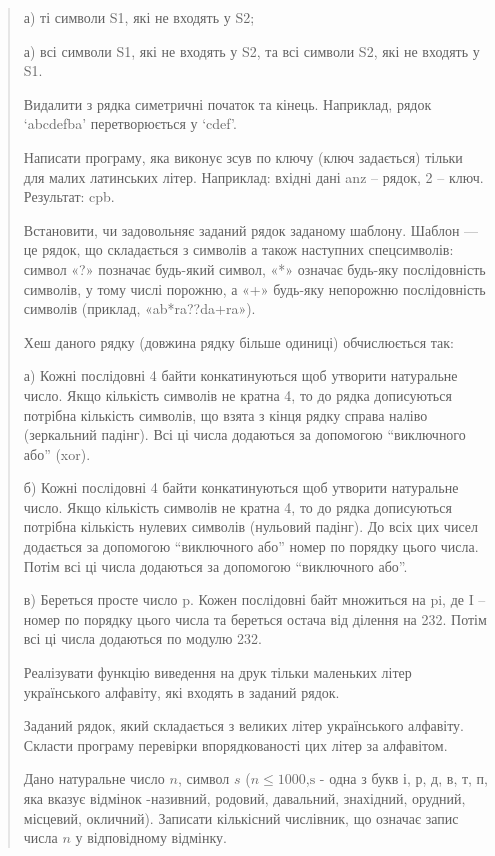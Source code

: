 \documentclass[]{article}
\begin{document}
\begin{quote}
а) ті символи S1, які не входять у S2;

а) всі символи S1, які не входять у S2, та всі символи S2, які не
входять у S1.

Видалити з рядка симетричні початок та кінець. Наприклад, рядок
`abcdefba' перетворюється у `cdef'.

Написати програму, яка виконує зсув по ключу (ключ задається) тільки для
малих латинських літер. Наприклад: вхідні дані anz -- рядок, 2 -- ключ.
Результат: cpb.

Встановити, чи задовольняє заданий рядок заданому шаблону. Шаблон --- це
рядок, що складається з символів а також наступних спецсимволів: символ
«?» позначає будь-який символ, «*» означає будь-яку послідовність
символів, у тому числі порожню, а «+» будь-яку непорожню послідовність
символів (приклад, «ab*ra??da+ra»).

Хеш даного рядку (довжина рядку більше одиниці) обчислюється так:

а) Кожні послідовні 4 байти конкатинуються щоб утворити натуральне
число. Якщо кількість символів не кратна 4, то до рядка дописуються
потрібна кількість символів, що взята з кінця рядку справа наліво
(зеркальний падінг). Всі ці числа додаються за допомогою ``виключного
або'' (xor).

б) Кожні послідовні 4 байти конкатинуються щоб утворити натуральне
число. Якщо кількість символів не кратна 4, то до рядка дописуються
потрібна кількість нулевих символів (нульовий падінг). До всіх цих чисел
додається за допомогою ``виключного або'' номер по порядку цього числа.
Потім всі ці числа додаються за допомогою ``виключного або''.

в) Береться просте число p. Кожен послідовні байт множиться на pi, де I
-- номер по порядку цього числа та береться остача від ділення на 232.
Потім всі ці числа додаються по модулю 232.

Реалізувати функцію виведення на друк тільки маленьких літер
українського алфавіту, які входять в заданий рядок.

Заданий рядок, який складається з великих літер українського алфавіту.
Скласти програму перевірки впорядкованості цих літер за алфавітом.

Дано натуральне число \(n\), символ \(s\)
(\(n \leq 1000\),\(\text{s\ }\)- одна з букв і, р, д, в, т, п, яка
вказує відмінок -називний, родовий, давальний, знахідний, орудний,
місцевий, окличний). Записати кількісний числівник, що означає запис
числа \(n\) у відповідному відмінку.


\end{quote}
\end{document}
